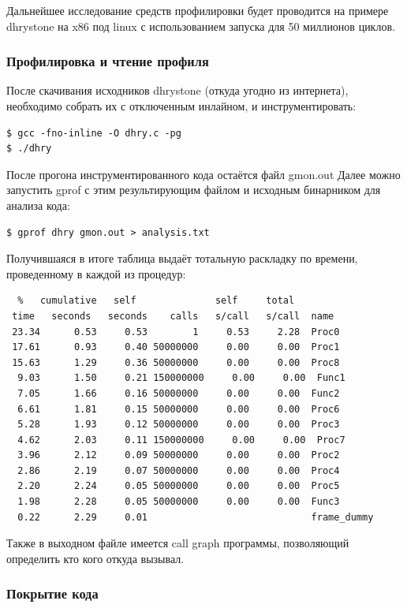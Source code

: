 \documentclass[a4paper,12pt,oneside]{article}
\begin{document}
Дальнейшее исследование средств профилировки будет проводится на примере dhrystone на x86 под linux с использованием запуска для 50 миллионов циклов.

\subsubsection{Профилировка и чтение профиля}\label{subsubsec:gprof}

После скачивания исходников dhrystone (откуда угодно из интернета), необходимо собрать их с отключенным инлайном, и инструментировать:

\begin{verbatim}
$ gcc -fno-inline -O dhry.c -pg
$ ./dhry
\end{verbatim}

После прогона инструментированного кода остаётся файл gmon.out
Далее можно запустить gprof с этим результирующим файлом и исходным бинарником для анализа кода:

\begin{verbatim}
$ gprof dhry gmon.out > analysis.txt
\end{verbatim}

Получившаяся в итоге таблица выдаёт тотальную раскладку по времени, проведенному в каждой из процедур:

\begin{verbatim}
  %   cumulative   self              self     total
 time   seconds   seconds    calls   s/call   s/call  name
 23.34      0.53     0.53        1     0.53     2.28  Proc0
 17.61      0.93     0.40 50000000     0.00     0.00  Proc1
 15.63      1.29     0.36 50000000     0.00     0.00  Proc8
  9.03      1.50     0.21 150000000     0.00     0.00  Func1
  7.05      1.66     0.16 50000000     0.00     0.00  Func2
  6.61      1.81     0.15 50000000     0.00     0.00  Proc6
  5.28      1.93     0.12 50000000     0.00     0.00  Proc3
  4.62      2.03     0.11 150000000     0.00     0.00  Proc7
  3.96      2.12     0.09 50000000     0.00     0.00  Proc2
  2.86      2.19     0.07 50000000     0.00     0.00  Proc4
  2.20      2.24     0.05 50000000     0.00     0.00  Proc5
  1.98      2.28     0.05 50000000     0.00     0.00  Func3
  0.22      2.29     0.01                             frame_dummy
\end{verbatim}

Также в выходном файле имеется call graph программы, позволяющий определить кто кого откуда вызывал.

\subsubsection{Покрытие кода}\label{subsubsec:gcov}
\end{document}
